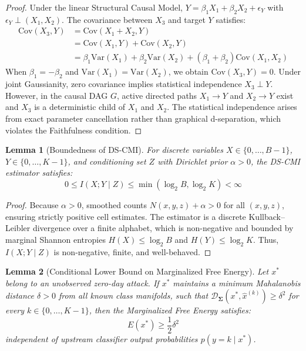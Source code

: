 \documentclass[10pt,journal,compsoc]{IEEEtran}
\newtheorem{lemma}{Lemma}
\begin{document}
\begin{proof}
Under the linear Structural Causal Model, $Y = \beta_1 X_1 + \beta_2 X_2 + \epsilon_Y$ with $\epsilon_Y \perp (X_1, X_2)$. The covariance between $X_3$ and target $Y$ satisfies:
\begin{align}
\text{Cov}(X_3, Y) &= \text{Cov}(X_1 + X_2, Y) \nonumber \\
&= \text{Cov}(X_1, Y) + \text{Cov}(X_2, Y) \nonumber \\
&= \beta_1 \text{Var}(X_1) + \beta_2 \text{Var}(X_2) + (\beta_1 + \beta_2)\text{Cov}(X_1, X_2)
\end{align}
When $\beta_1 = -\beta_2$ and $\text{Var}(X_1) = \text{Var}(X_2)$, we obtain $\text{Cov}(X_3, Y) = 0$. Under joint Gaussianity, zero covariance implies statistical independence $X_3 \perp Y$. However, in the causal DAG $G$, active directed paths $X_1 \to Y$ and $X_2 \to Y$ exist and $X_3$ is a deterministic child of $X_1$ and $X_2$. The statistical independence arises from exact parameter cancellation rather than graphical d-separation, which violates the Faithfulness condition.
\end{proof}

\begin{lemma}[Boundedness of DS-CMI]
For discrete variables $X \in \{0, \dots, B-1\}$, $Y \in \{0, \dots, K-1\}$, and conditioning set $Z$ with Dirichlet prior $\alpha > 0$, the DS-CMI estimator satisfies:
\begin{equation}
0 \le I(X; Y \mid Z) \le \min(\log_2 B, \log_2 K) < \infty
\end{equation}
\end{lemma}

\begin{proof}
Because $\alpha > 0$, smoothed counts $N(x, y, z) + \alpha > 0$ for all $(x, y, z)$, ensuring strictly positive cell estimates. The estimator is a discrete Kullback--Leibler divergence over a finite alphabet, which is non-negative and bounded by marginal Shannon entropies $H(X) \le \log_2 B$ and $H(Y) \le \log_2 K$. Thus, $I(X; Y \mid Z)$ is non-negative, finite, and well-behaved.
\end{proof}

\begin{lemma}[Conditional Lower Bound on Marginalized Free Energy]
Let $x^*$ belong to an unobserved zero-day attack. If $x^*$ maintains a minimum Mahalanobis distance $\delta > 0$ from all known class manifolds, such that $\mathcal{D}_{\mathbf{\Sigma}}(x^*, \hat{x}^{(k)}) \ge \delta^2$ for every $k \in \{0, \dots, K-1\}$, then the Marginalized Free Energy satisfies:
\begin{equation}
E(x^*) \ge \frac{1}{2} \delta^2
\end{equation}
independent of upstream classifier output probabilities $p(y = k \mid x^*)$.
\end{lemma}
\end{document}
